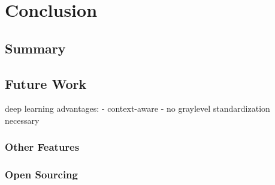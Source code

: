 \chapter{Conclusion}
\section{Summary}
\section{Future Work}
deep learning advantages:
- context-aware
- no graylevel standardization necessary
\subsection{Other Features}
\subsection{Open Sourcing}
